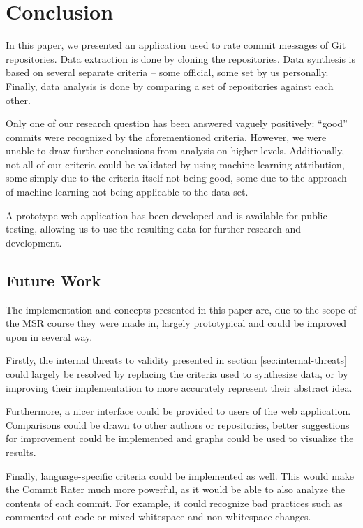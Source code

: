 \section{Conclusion}
\label{sec:conclusion}

In this paper, we presented an application used to rate commit messages of Git repositories. Data extraction is done by cloning the repositories. Data synthesis is based on several separate criteria -- some official, some set by us personally. Finally, data analysis is done by comparing a set of repositories against each other.

Only one of our research question has been answered vaguely positively: ``good'' commits were recognized by the aforementioned criteria. However, we were unable to draw further conclusions from analysis on higher levels. Additionally, not all of our criteria could be validated by using machine learning attribution, some simply due to the criteria itself not being good, some due to the approach of machine learning not being applicable to the data set.

A prototype web application has been developed and is available for public testing, allowing us to use the resulting data for further research and development.


\subsection{Future Work}
\label{sec:future-work}

The implementation and concepts presented in this paper are, due to the scope of the MSR course they were made in, largely prototypical and could be improved upon in several way.

Firstly, the internal threats to validity presented in section \ref{sec:internal-threats} could largely be resolved by replacing the criteria used to synthesize data, or by improving their implementation to more accurately represent their abstract idea.

Furthermore, a nicer interface could be provided to users of the web application. Comparisons could be drawn to other authors or repositories, better suggestions for improvement could be implemented and graphs could be used to visualize the results.

Finally, language-specific criteria could be implemented as well. This would make the Commit Rater much more powerful, as it would be able to also analyze the contents of each commit. For example, it could recognize bad practices such as commented-out code or mixed whitespace and non-whitespace changes.

